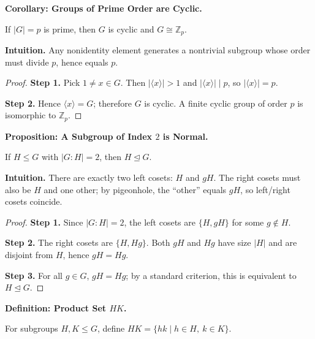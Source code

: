\documentclass[9pt]{article}
\theoremstyle{definition}
\begin{document}
\newpage

\noindent\textbf{Corollary: Groups of Prime Order are Cyclic.}

\newpage

If $|G|=p$ is prime, then $G$ is cyclic and $G\cong \mathbb{Z}_p$.

\dotfill

\noindent\textbf{Intuition.}
Any nonidentity element generates a nontrivial subgroup whose order must divide $p$, hence equals $p$.

\dotfill

\begin{proof}
\textbf{Step 1.} Pick $1\ne x\in G$. Then $|\langle x\rangle|>1$ and $|\langle x\rangle|\mid p$, so $|\langle x\rangle|=p$.

\textbf{Step 2.} Hence $\langle x\rangle=G$; therefore $G$ is cyclic. A finite cyclic group of order $p$ is isomorphic to $\mathbb{Z}_p$.
\end{proof}

\newpage

\noindent\textbf{Proposition: A Subgroup of Index $2$ is Normal.}

\newpage

If $H\le G$ with $|G:H|=2$, then $H\trianglelefteq G$.

\dotfill

\noindent\textbf{Intuition.}
There are exactly two left cosets: $H$ and $gH$. The right cosets must also be $H$ and one other; by pigeonhole, the “other” equals $gH$, so left/right cosets coincide.

\dotfill

\begin{proof}
\textbf{Step 1.} Since $|G:H|=2$, the left cosets are $\{H,gH\}$ for some $g\notin H$.

\textbf{Step 2.} The right cosets are $\{H,Hg\}$. Both $gH$ and $Hg$ have size $|H|$ and are disjoint from $H$, hence $gH=Hg$.

\textbf{Step 3.} For all $g\in G$, $gH=Hg$; by a standard criterion, this is equivalent to $H\trianglelefteq G$.
\end{proof}

\newpage

\noindent\textbf{Definition: Product Set $HK$.}

\newpage

For subgroups $H,K\le G$, define $HK=\{hk\mid h\in H,\ k\in K\}$.
\end{document}
